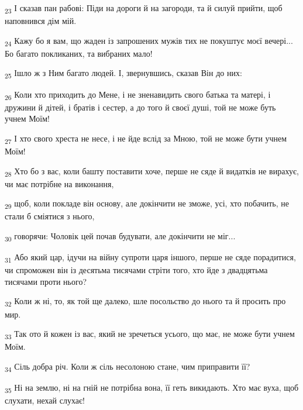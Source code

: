 \begin{tcolorbox}
\textsubscript{23} І сказав пан рабові: Піди на дороги й на загороди, та й силуй прийти, щоб наповнився дім мій.
\end{tcolorbox}
\begin{tcolorbox}
\textsubscript{24} Кажу бо я вам, що жаден із запрошених мужів тих не покуштує моєї вечері... Бо багато покликаних, та вибраних мало!
\end{tcolorbox}
\begin{tcolorbox}
\textsubscript{25} Ішло ж з Ним багато людей. І, звернувшись, сказав Він до них:
\end{tcolorbox}
\begin{tcolorbox}
\textsubscript{26} Коли хто приходить до Мене, і не зненавидить свого батька та матері, і дружини й дітей, і братів і сестер, а до того й своєї душі, той не може буть учнем Моїм!
\end{tcolorbox}
\begin{tcolorbox}
\textsubscript{27} І хто свого хреста не несе, і не йде вслід за Мною, той не може бути учнем Моїм!
\end{tcolorbox}
\begin{tcolorbox}
\textsubscript{28} Хто бо з вас, коли башту поставити хоче, перше не сяде й видатків не вирахує, чи має потрібне на виконання,
\end{tcolorbox}
\begin{tcolorbox}
\textsubscript{29} щоб, коли покладе він основу, але докінчити не зможе, усі, хто побачить, не стали б сміятися з нього,
\end{tcolorbox}
\begin{tcolorbox}
\textsubscript{30} говорячи: Чоловік цей почав будувати, але докінчити не міг...
\end{tcolorbox}
\begin{tcolorbox}
\textsubscript{31} Або який цар, ідучи на війну супроти царя іншого, перше не сяде порадитися, чи спроможен він із десятьма тисячами стріти того, хто йде з двадцятьма тисячами проти нього?
\end{tcolorbox}
\begin{tcolorbox}
\textsubscript{32} Коли ж ні, то, як той ще далеко, шле посольство до нього та й просить про мир.
\end{tcolorbox}
\begin{tcolorbox}
\textsubscript{33} Так ото й кожен із вас, який не зречеться усього, що має, не може бути учнем Моїм.
\end{tcolorbox}
\begin{tcolorbox}
\textsubscript{34} Сіль добра річ. Коли ж сіль несолоною стане, чим приправити її?
\end{tcolorbox}
\begin{tcolorbox}
\textsubscript{35} Ні на землю, ні на гній не потрібна вона, її геть викидають. Хто має вуха, щоб слухати, нехай слухає!
\end{tcolorbox}
